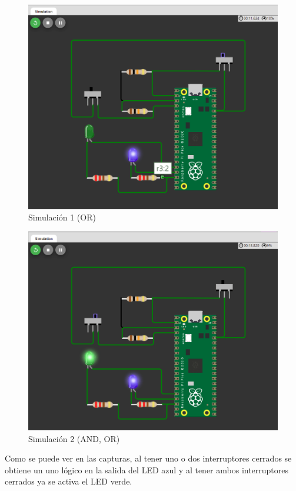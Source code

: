 \documentclass{article}
\begin{document}
    \begin{figure}[H]
        \centering
        \includegraphics[width=0.5\paperwidth]{images/wokwi-example-2-sim-1}
        \caption{Simulación 1 (OR)}
    \end{figure}

    \begin{figure}[H]
        \centering
        \includegraphics[width=0.5\paperwidth]{images/wokwi-example-2-sim-2}
        \caption{Simulación 2 (AND, OR)}
    \end{figure}

    Como se puede ver en las capturas, al tener uno o dos interruptores cerrados se obtiene un uno lógico en la salida del LED azul y al tener ambos interruptores cerrados ya se activa el LED verde.
\end{document}
